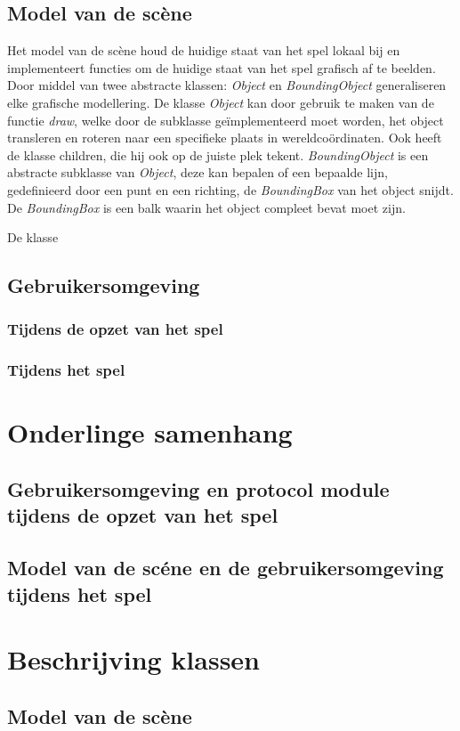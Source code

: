 \documentclass[a4paper,11pt]{article}
\begin{document}
	
    \subsection{Model van de sc\`ene}
    Het model van de sc\`ene houd de huidige staat van het spel lokaal bij en implementeert functies om de huidige staat van het spel grafisch af te beelden. Door middel van twee abstracte klassen: \emph{Object} en \emph{BoundingObject} generaliseren elke grafische modellering. De klasse \emph{Object} kan door gebruik te maken van de functie \emph{draw}, welke door de subklasse ge\"implementeerd moet worden, het object transleren en roteren naar een specifieke plaats in wereldco\"ordinaten. Ook heeft de klasse children, die hij ook op de juiste plek tekent. \emph{BoundingObject} is een abstracte subklasse van \emph{Object}, deze kan bepalen of een bepaalde lijn, gedefinieerd door een punt en een richting, de \emph{BoundingBox} van het object snijdt. De \emph{BoundingBox} is een balk waarin het object compleet bevat moet zijn.
    
    De klasse 
    \subsection{Gebruikersomgeving}
    
    \subsubsection{Tijdens de opzet van het spel}
    
    \subsubsection{Tijdens het spel}
    
    \section{Onderlinge samenhang}
    
    \subsection{Gebruikersomgeving en protocol module tijdens de opzet van het spel}
    
    \subsection{Model van de sc\'ene en de gebruikersomgeving tijdens het spel}
    
    \section{Beschrijving klassen}
    
    \subsection{Model van de sc\`ene}
    
\end{document}
